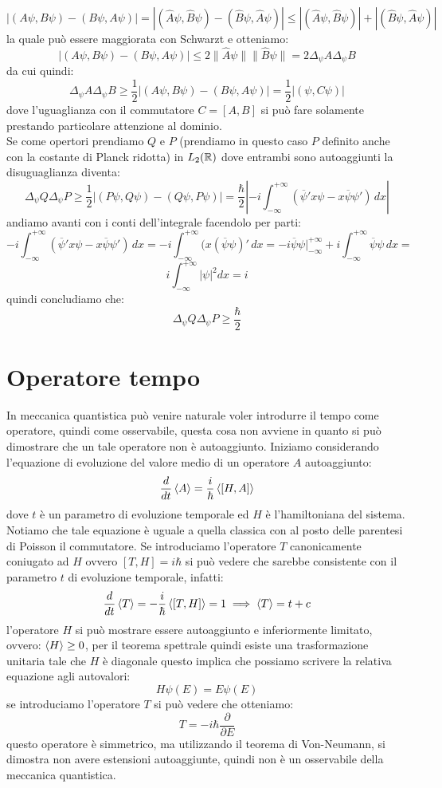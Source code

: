 \[|(A\psi,B\psi) -(B\psi,A\psi)| = |(\hat{A}\psi,\hat{B}\psi) - (\hat{B}\psi,\hat{A}\psi)| \leq |(\hat{A}\psi,\hat{B}\psi)| +|(\hat{B}\psi,\hat{A}\psi)| \]
la quale può essere maggiorata con Schwarzt e otteniamo:
\[ |(A\psi,B\psi) -(B\psi,A\psi)| \leq 2 \|\hat{A}\psi\|\|\hat{B}\psi\| = 2\Delta_\psi A \Delta_\psi B \]
da cui quindi:
\[\Delta_\psi A \Delta_\psi B\geq \frac{1}{2}|(A\psi,B\psi) -(B\psi,A\psi)| = \frac{1}{2}|(\psi,C\psi)| \]
dove l'uguaglianza con il commutatore $C=[A,B]$ si può fare solamente prestando particolare attenzione al dominio.\\
Se come opertori prendiamo $Q$ e $P$ (prendiamo in questo caso $P$ definito anche con la costante di Planck ridotta) in $L_2(\mathbb{R})$ dove entrambi sono autoaggiunti la disuguaglianza diventa:
\[\Delta_\psi Q \Delta_\psi P\geq \frac{1}{2}|(P\psi,Q\psi) -(Q\psi,P\psi)| = \frac{\hbar}{2}\left|-i\int_{-\infty}^{+\infty}(\overline{\psi}'x\psi - x\overline{\psi}\psi')\,dx\right|\]
andiamo avanti con i conti dell'integrale facendolo per parti:
\[-i\int_{-\infty}^{+\infty}(\overline{\psi}'x\psi - x\overline{\psi}\psi')\,dx = -i\int_{-\infty}^{+\infty}(x(\overline{\psi}\psi)'\,dx = -i\overline{\psi}\psi\Big|_{-\infty}^{+\infty} +i\int_{-\infty}^{+\infty}\overline{\psi}\psi\,dx =\]
\[i\int_{-\infty}^{+\infty}|\psi|^2dx = i\]
quindi concludiamo che:
\[\Delta_\psi Q \Delta_\psi P\geq \frac{\hbar}{2}\]
\section{Operatore tempo}
In meccanica quantistica può venire naturale voler introdurre il tempo come operatore, quindi come osservabile, questa cosa non avviene in quanto si può dimostrare che un tale operatore non è autoaggiunto. Iniziamo considerando l'equazione di evoluzione del valore medio di un operatore $A$ autoaggiunto:
\[\frac{d}{dt}\braket{A} = \frac{i}{\hbar}\braket{[H,A]}\]
dove $t$ è un parametro di evoluzione temporale ed $H$ è l'hamiltoniana del sistema. Notiamo che tale equazione è uguale a quella classica con al posto delle parentesi di Poisson il commutatore. Se introduciamo l'operatore $T$ canonicamente coniugato ad $H$ ovvero $[T,H] = i\hbar$ si può vedere che sarebbe consistente con il parametro $t$ di evoluzione temporale, infatti:
\[\frac{d}{dt}\braket{T} = -\frac{i}{\hbar}\braket{[T,H]} = 1  \implies \braket{T} = t + c\]
l'operatore $H$ si può mostrare essere autoaggiunto e inferiormente limitato, ovvero: $\braket{H}\geq 0$, per il teorema spettrale quindi esiste una trasformazione unitaria tale che $H$ è diagonale questo implica che possiamo scrivere la relativa equazione agli autovalori:
\[H\psi(E) = E\psi(E)\]
se introduciamo l'operatore $T$ si può vedere che otteniamo:
\[T= -i\hbar\frac{\partial}{\partial E}\]
questo operatore è simmetrico, ma utilizzando il teorema di Von-Neumann, si dimostra non avere estensioni autoaggiunte, quindi non è un osservabile della meccanica quantistica.
